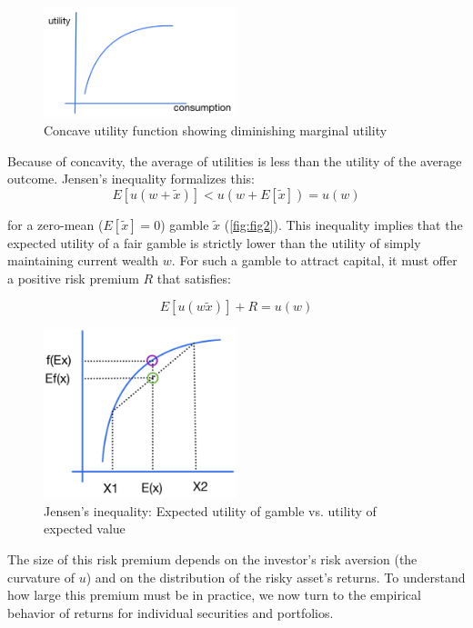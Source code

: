 \begin{figure}[h]
    \centering
    \includegraphics[width=0.50\textwidth]{fig1.png}
    \caption{Concave utility function showing diminishing marginal utility}
    \label{fig:fig1}
\end{figure}

Because of concavity, the average of utilities is less than the utility of the average outcome. Jensen’s inequality formalizes this:
$$E[u(w + \tilde{x})] < u(w + E[\tilde{x}]) = u(w)$$

for a zero-mean ($E[\tilde{x}] = 0$) gamble $\tilde{x}$ (\autoref{fig:fig2}). This inequality implies that the expected utility of a fair gamble is strictly lower than the utility of simply maintaining current wealth $w$. For such a gamble to attract capital, it must offer a positive risk premium $R$ that satisfies:

$$E[u(w \tilde{x})] + R = u(w)$$

\begin{figure}[h]
    \centering
    \includegraphics[width=0.50\textwidth]{fig2.png}
    \caption{Jensen's inequality: Expected utility of gamble vs. utility of expected value}
    \label{fig:fig2}
\end{figure}

The size of this risk premium depends on the investor’s risk aversion (the curvature of $u$) and on the distribution of the risky asset’s returns. To understand how large this premium must be in practice, we now turn to the empirical behavior of returns for individual securities and portfolios.